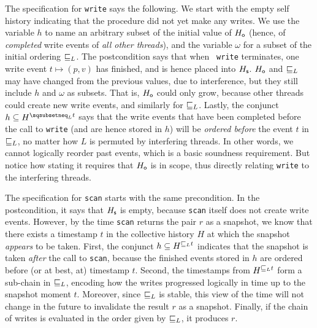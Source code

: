 The specification for {\tt write} says the following. We start with
the empty self history indicating that the procedure did not yet make
any writes. We use the variable $h$ to name an arbitrary subset of the
initial value of $H_{\mathsf{o}}$ (hence, of \emph{completed} write events of
\emph{all other threads}), and the variable $\omega$ for a subset of
the initial ordering $\mathrel{\sqsubseteq_L}$. The postcondition says that when {\tt
  write} terminates, one write event $t \mapsto (p, v)$ has finished,
and is hence placed into $H_{\mathsf{s}}$.  $H_{\mathsf{o}}$ and $\mathrel{\sqsubseteq_L}$ may have
changed from the previous values, due to interference, but they still
include $h$ and $\omega$ as subsets. That is, $H_{\mathsf{o}}$ could only
grow, because other threads could create new write events, and
similarly for $\mathrel{\sqsubseteq_L}$. Lastly, the conjunct $h \subseteq
H^{\hbox{}\sqsubsetneq_\ordlist t}$ says that the write events that
have been completed before the call to {\tt write} (and are hence
stored in $h$) will be \emph{ordered before} the event $t$ in $\mathrel{\sqsubseteq_L}$,
no matter how $L$ is permuted by interfering threads. In other words,
we cannot logically reorder past events, which is a basic soundness
requirement. But notice how stating it requires that $H_{\mathsf{o}}$ is in
scope, thus directly relating {\tt write} to the interfering threads.

The specification for {\tt scan} starts with the same precondition. In
the postcondition, it says that $H_{\mathsf{s}}$ is empty, because {\tt scan}
itself does not create write events. However, by the time {\tt scan}
returns the pair $r$ as a snapshot, we know that there exists a
timestamp $t$ in the collective history $H$ at which the snapshot
\emph{appears} to be taken. First, the conjunct $h \subseteq
H^{\hbox{}\mathrel{\sqsubseteq_L} t}$ indicates that the snapshot is taken \emph{after}
the call to {\tt scan}, because the finished events stored in $h$ are
ordered before (or at best, at) timestamp $t$.
%
%
%
Second, the timestamps from $H^{\hbox{}\mathrel{\sqsubseteq_L} t}$ form a sub-chain in
$\mathrel{\sqsubseteq_L}$,  %
%
encoding how the writes progressed logically in time up to the
snapshot moment $t$. Moreover, since $\mathrel{\sqsubseteq_L}$ is stable, this view
of the time will not change in the future to invalidate the result $r$
as a snapshot. Finally, if the chain of writes is evaluated in the
order given by $\mathrel{\sqsubseteq_L}$, it produces $r$.

